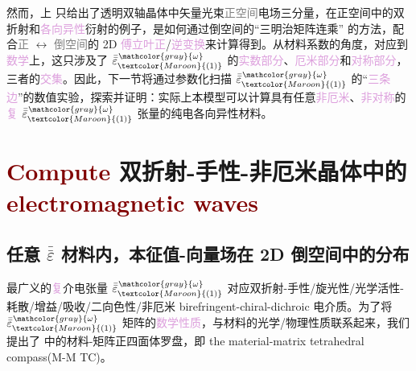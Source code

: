 然而，上  只给出了\textcolor{PineGreen}{透明双轴}晶体中\textcolor{PineGreen}{矢量光束}\textcolor{gray}{正空间}电场三分量，在正空间中的\textcolor{PineGreen}{双折射}和\textcolor{Plum}{各向异性}衍射的例子，是如何通过倒空间的“三明治矩阵连乘”  的方法，配合\textcolor{gray}{正} $\longleftrightarrow$ \textcolor{gray}{倒空间}的 2D \textcolor{Plum}{傅立叶正}/\textcolor{Plum}{逆变换}来计算得到。从材料系数的角度，对应到\textcolor{Plum}{数学}上，这只涉及了 $\bar{\bar{\varepsilon}}^{\;\! \mathcolor{gray}{\omega}}_{\textcolor{Maroon}{(1)}}$ 的\textcolor{Plum}{实数部分}、\textcolor{Plum}{厄米部分}和\textcolor{Plum}{对称部分}，三者的\textcolor{Plum}{交集}。因此，下一节将通过参数化扫描 $\bar{\bar{\varepsilon}}^{\;\! \mathcolor{gray}{\omega}}_{\textcolor{Maroon}{(1)}}$ 的“\textcolor{Plum}{三条边}”的数值实验，探索并证明：实际上本模型可以计算具有任意\textcolor{Plum}{非厄米}、\textcolor{Plum}{非对称}的\textcolor{Plum}{复} $\bar{\bar{\varepsilon}}^{\;\! \mathcolor{gray}{\omega}}_{\textcolor{Maroon}{(1)}}$ 张量的\textcolor{PineGreen}{纯电各向异性}材料。

\section{\textcolor{Maroon}{Compute} 双折射-手性-非厄米晶体中的 \textcolor{Maroon}{electromagnetic waves}}\label{sec:birefringent-chiral-dichroic}

\vspace*{-5.5em}

\subsection{任意 \texorpdfstring{$\bar{\bar{\varepsilon}}$}{$\bar{\bar{\text{ε}}}$} 材料内，本征值-向量场在 2D 倒空间中的分布}\label{ssec:2D-reciprocal-eigensystems}

最广义的\textcolor{Plum}{复}介电张量 $\bar{\bar{\varepsilon}}^{\;\! \mathcolor{gray}{\omega}}_{\textcolor{Maroon}{(1)}}$ 对应\textcolor{NavyBlue}{双折射-手性/旋光性/光学活性-耗散/增益/吸收/二向色性/非厄米} birefringent-chiral-dichroic 电介质\cite{samlanChiralDynamicsExceptional2018}。为了将 $\bar{\bar{\varepsilon}}^{\;\! \mathcolor{gray}{\omega}}_{\textcolor{Maroon}{(1)}}$ 矩阵的\textcolor{Plum}{数学性质}，与材料的\textcolor{NavyBlue}{光学}/\textcolor{NavyBlue}{物理性质}联系起来，我们提出了  中的\textcolor{NavyBlue}{材料-矩阵正四面体罗盘}，即 the material-matrix tetrahedral compass(\textcolor{NavyBlue}{M-M TC})。

